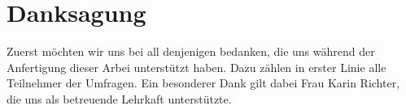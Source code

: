  
\vspace*{5cm}
\section*{Danksagung}
Zuerst möchten wir uns bei all denjenigen bedanken, die uns während der Anfertigung dieser Arbei unterstützt haben. 
Dazu zählen in erster Linie alle Teilnehmer der Umfragen.
Ein besonderer Dank gilt dabei Frau Karin Richter, die uns als betreuende Lehrkaft unterstützte.
\newpage
